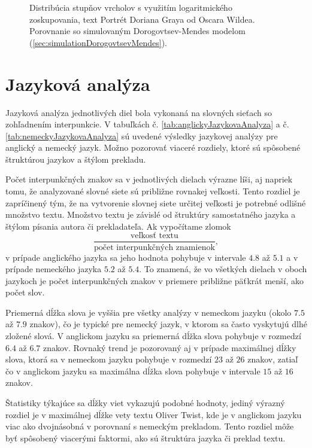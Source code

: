 \begin{figure}[htbp]
    \vspace{0.3cm}
    \caption{Distribúcia stupňov vrcholov s využitím logaritmického zoskupovania, text Portrét Doriana Graya od Oscara Wildea. Porovnanie so simulovaným Dorogovtsev-Mendes modelom (\ref{sec:simulationDorogovtsevMendes}).}\label{fig:lbdegdistDorian}
\end{figure}

\clearpage

\section{Jazyková analýza}\label{sec:jazykovaAnalyza}

Jazyková analýza jednotlivých diel bola vykonaná na slovných sieťach so zohľadnením interpunkcie.
V tabuľkách č. \ref{tab:anglickyJazykovaAnalyza} a č. \ref{tab:nemeckyJazykovaAnalyza} sú uvedené výsledky jazykovej analýzy pre anglický a nemecký jazyk.
Možno pozorovať viaceré rozdiely, ktoré sú spôsobené štruktúrou jazykov a štýlom prekladu.

Počet interpunkčných znakov sa v jednotlivých dielach výrazne líši, aj napriek tomu, že analyzované slovné siete sú približne rovnakej veľkosti.
Tento rozdiel je zapríčinený tým, že na vytvorenie slovnej siete určitej veľkosti je potrebné odlišné množstvo textu. Množstvo textu je závislé od
štruktúry samostatného jazyka a štýlom písania autora či prekladateľa. Ak vypočítame zlomok
\[
\frac{\text{veľkosť textu}}{\text{počet interpunkčných znamienok}},
\]
v prípade anglického jazyka sa jeho hodnota pohybuje v intervale $4.8$ až $5.1$ a v prípade nemeckého jazyka $5.2$ až $5.4$.
To znamená, že vo všetkých dielach v oboch jazykoch je počet interpunkčných znakov v priemere približne päťkrát menší, ako počet slov.

Priemerná dĺžka slova je vyššia pre všetky analýzy v nemeckom jazyku (okolo $7.5$ až $7.9$ znakov), čo je typické pre nemecký jazyk, v ktorom sa
často vyskytujú dlhé zložené slová. V anglickom jazyku sa priemerná dĺžka slova pohybuje v rozmedzí $6.4$ až $6.7$ znakov. Rovnaký 
trend je pozorovaný aj v prípade maximálnej dĺžky slova, ktorá sa v nemeckom jazyku pohybuje v rozmedzí $23$ až $26$ znakov, zatiaľ čo v anglickom jazyku
sa maximálna dĺžka slova pohybuje v intervale $15$ až $16$ znakov.

Štatistiky týkajúce sa dĺžky viet vykazujú podobné hodnoty, jediný výrazný rozdiel je v maximálnej dĺžke vety textu Oliver Twist, kde je v anglickom jazyku
viac ako dvojnásobná v porovnaní s nemeckým prekladom. Tento rozdiel môže byť spôsobený viacerými faktormi, ako sú štruktúra jazyka či preklad textu.	

